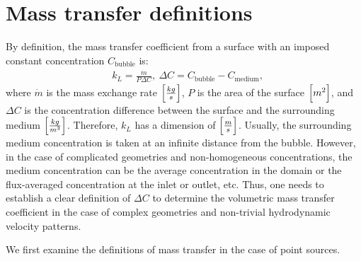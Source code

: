 \documentclass{article}
\newcommand{\beqal}{\begin{equation}\begin{aligned}}
\newcommand{\feqal}{\end{aligned}\end{equation}}
\newcommand{\cbubble}{C_{\mathrm{bubble}}}
\newcommand{\cmedium}{C_{\mathrm{medium}}}
\begin{document}
\section{Mass transfer definitions}
By definition, the mass transfer coefficient from a surface with an imposed constant
concentration $\cbubble$ is:
\beqal
\label{eq:main:definition}
&k_L=\frac{\dot{m}}{P \Delta C},\ \Delta C= \cbubble - \cmedium,
\feqal
where $\dot{m}$ is the mass exchange rate $\Bigl[\frac{kg}{s}\Bigr]$, $P$ is the area of the surface
$\Bigl[m^2\Bigr]$, and $\Delta C$ is the concentration difference between the surface and the surrounding medium
$\Bigl[\frac{kg}{m^3}\Bigr]$. Therefore, $k_L$ has a dimension of 
$\Bigl[\frac{m}{s}\Bigr]$. Usually, the surrounding medium concentration is taken at an infinite distance
from the bubble. However, in the case of complicated geometries and non-homogeneous concentrations, 
the medium concentration can be the average concentration in the domain or the flux-averaged
concentration at the inlet or outlet, etc. Thus, one needs to establish a clear definition of  $\Delta C$ to determine the volumetric
mass transfer coefficient in the case of complex geometries and non-trivial hydrodynamic velocity patterns.

We first examine the
 definitions of mass transfer in the case of point  sources.
\end{document}
